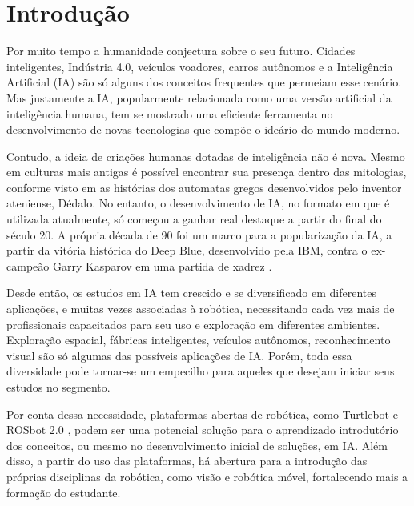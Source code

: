 \chapter{Introdução}
\label{chap:intro}

Por muito tempo a humanidade conjectura sobre o seu futuro. Cidades inteligentes, Indústria 4.0, veículos voadores, carros autônomos e a Inteligência Artificial (IA) são só alguns dos conceitos frequentes que permeiam esse cenário. Mas justamente a IA, popularmente relacionada como uma versão artificial da inteligência humana, tem se mostrado uma eficiente ferramenta no desenvolvimento de novas tecnologias que compõe o ideário do mundo moderno.

Contudo, a ideia de criações humanas dotadas de inteligência não é nova. Mesmo em culturas mais antigas é possível encontrar sua presença dentro das mitologias, conforme visto em  as histórias dos automatas gregos desenvolvidos pelo inventor ateniense, Dédalo. No entanto, o desenvolvimento de IA, no formato em que é utilizada atualmente, só começou a ganhar real destaque a partir do final do século 20. A própria década de 90 foi um marco para a popularização da IA, a partir da vitória histórica do Deep Blue, desenvolvido pela IBM, contra o ex-campeão Garry Kasparov em uma partida de xadrez \cite{McCorduck2004}. 

Desde então, os estudos em IA tem crescido e se diversificado em diferentes aplicações, e muitas vezes associadas à robótica, necessitando cada vez mais de profissionais capacitados para seu uso e exploração em diferentes ambientes. Exploração espacial, fábricas inteligentes, veículos autônomos, reconhecimento visual são só algumas das possíveis aplicações de IA. Porém, toda essa diversidade pode tornar-se um empecilho para aqueles que desejam iniciar seus estudos no segmento.

Por conta dessa necessidade, plataformas abertas de robótica, como Turtlebot \cite{Turtlebot} e ROSbot 2.0 \cite{ROSbot}, podem ser uma potencial solução para o aprendizado introdutório dos conceitos, ou mesmo no desenvolvimento inicial de soluções, em IA. Além disso, a partir do uso das plataformas, há abertura para a introdução das próprias disciplinas da robótica, como visão e robótica móvel, fortalecendo mais a formação do estudante.

